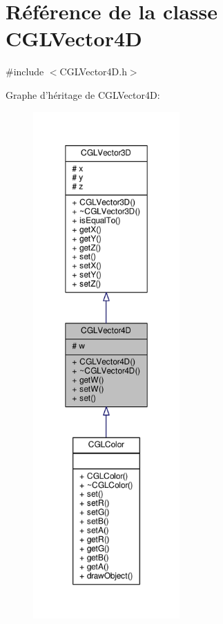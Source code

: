 \hypertarget{class_c_g_l_vector4_d}{\section{Référence de la classe C\-G\-L\-Vector4\-D}
\label{class_c_g_l_vector4_d}
}


{\ttfamily \#include $<$C\-G\-L\-Vector4\-D.\-h$>$}



Graphe d'héritage de C\-G\-L\-Vector4\-D\-:\nopagebreak
\begin{figure}[H]
\begin{center}
\leavevmode
\includegraphics[height=550pt]{d9/d02/class_c_g_l_vector4_d__inherit__graph}
\end{center}
\end{figure}



